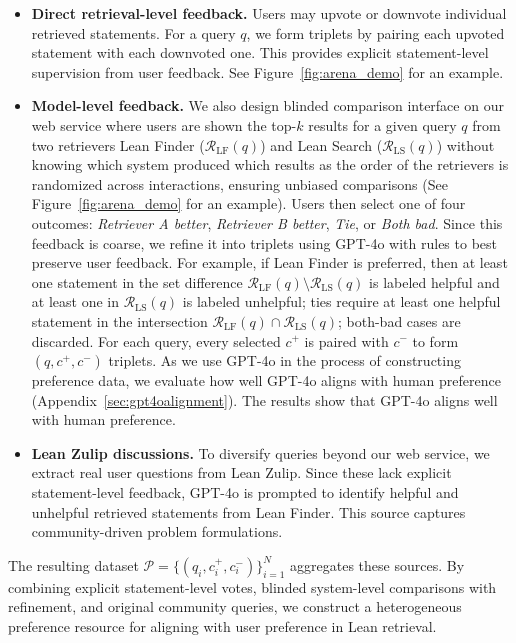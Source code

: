\documentclass{article} %
\begin{document}
\begin{itemize}
  \item \textbf{Direct retrieval-level feedback.}  
  Users may upvote or downvote individual retrieved statements. For a query $q$, we form triplets by pairing each upvoted statement with each downvoted one. This provides explicit statement-level supervision from user feedback. See Figure~\ref{fig:arena_demo} for an example.

  \item \textbf{Model-level feedback.} 
  We also design blinded comparison interface on our web service where users are shown the top-$k$ results for a given query $q$ from two retrievers Lean Finder ($\mathcal{R}_{\text{LF}}(q)$) and Lean Search ($\mathcal{R}_{\text{LS}}(q)$) without knowing which system produced which results as the order of the retrievers is randomized across interactions, ensuring unbiased comparisons (See Figure~\ref{fig:arena_demo} for an example). Users then select one of four outcomes: \emph{Retriever A better}, \emph{Retriever B better}, \emph{Tie}, or \emph{Both bad}. Since this feedback is coarse, we refine it into triplets using GPT-4o with rules to best preserve user feedback. For example, if Lean Finder is preferred, then at least one statement in the set difference $\mathcal{R}_{\text{LF}}(q)\setminus\mathcal{R}_{\text{LS}}(q)$ is labeled helpful and at least one in $\mathcal{R}_{\text{LS}}(q)$ is labeled unhelpful; ties require at least one helpful statement in the intersection $\mathcal{R}_{\text{LF}}(q) \cap \mathcal{R}_{\text{LS}}(q)$; both-bad cases are discarded. For each query, every selected $c^{+}$ is paired with $c^{-}$ to form $(q, c^{+}, c^{-})$ triplets. As we use GPT-4o in the process of constructing preference data, we evaluate how well GPT-4o aligns with human preference (Appendix~\ref{sec:gpt4oalignment}). The results show that GPT-4o aligns well with human preference.

  \item \textbf{Lean Zulip discussions.}  
  To diversify queries beyond our web service, we extract real user questions from Lean Zulip. Since these lack explicit statement-level feedback, GPT-4o is prompted to identify helpful and unhelpful retrieved statements from Lean Finder. This source captures community-driven problem formulations.  
\end{itemize}

The resulting dataset $\mathcal{P}=\{(q_i, c^{+}_i, c^{-}_i)\}_{i=1}^N$ aggregates these sources. By combining explicit statement-level votes, blinded system-level comparisons with refinement, and original community queries, we construct a heterogeneous preference resource for aligning with user preference in Lean retrieval.
\end{document}
